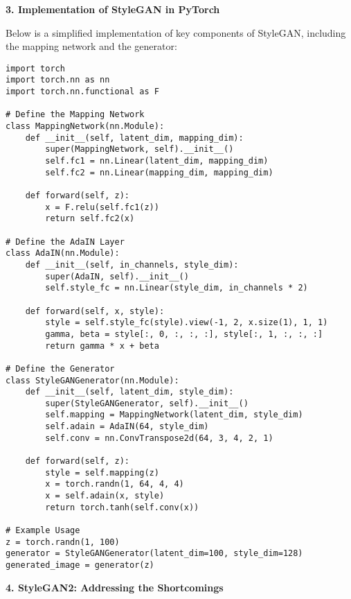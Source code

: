 \textbf{3. Implementation of StyleGAN in PyTorch}

Below is a simplified implementation of key components of StyleGAN, including the mapping network and the generator:

\begin{lstlisting}[style=python]
import torch
import torch.nn as nn
import torch.nn.functional as F

# Define the Mapping Network
class MappingNetwork(nn.Module):
    def __init__(self, latent_dim, mapping_dim):
        super(MappingNetwork, self).__init__()
        self.fc1 = nn.Linear(latent_dim, mapping_dim)
        self.fc2 = nn.Linear(mapping_dim, mapping_dim)
    
    def forward(self, z):
        x = F.relu(self.fc1(z))
        return self.fc2(x)

# Define the AdaIN Layer
class AdaIN(nn.Module):
    def __init__(self, in_channels, style_dim):
        super(AdaIN, self).__init__()
        self.style_fc = nn.Linear(style_dim, in_channels * 2)
    
    def forward(self, x, style):
        style = self.style_fc(style).view(-1, 2, x.size(1), 1, 1)
        gamma, beta = style[:, 0, :, :, :], style[:, 1, :, :, :]
        return gamma * x + beta

# Define the Generator
class StyleGANGenerator(nn.Module):
    def __init__(self, latent_dim, style_dim):
        super(StyleGANGenerator, self).__init__()
        self.mapping = MappingNetwork(latent_dim, style_dim)
        self.adain = AdaIN(64, style_dim)
        self.conv = nn.ConvTranspose2d(64, 3, 4, 2, 1)
    
    def forward(self, z):
        style = self.mapping(z)
        x = torch.randn(1, 64, 4, 4)
        x = self.adain(x, style)
        return torch.tanh(self.conv(x))

# Example Usage
z = torch.randn(1, 100)
generator = StyleGANGenerator(latent_dim=100, style_dim=128)
generated_image = generator(z)
\end{lstlisting}

\textbf{4. StyleGAN2: Addressing the Shortcomings}

